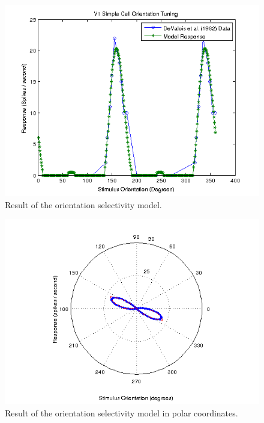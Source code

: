 \documentclass{article}
\begin{document}
\begin{figure}[h]
\begin{center}
\includegraphics[width=4.75in]{figures/orientation_tuning_full.png}
\caption{Result of the orientation selectivity model.}
\label{fig:oresult}
\end{center}
\end{figure}

\begin{figure}[h]
\begin{center}
\includegraphics[width=4.75in]{figures/orientation_neuron_polar.png}
\caption{Result of the orientation selectivity model in polar coordinates.}
\label{fig:opolar}
\end{center}
\end{figure}
\end{document}
